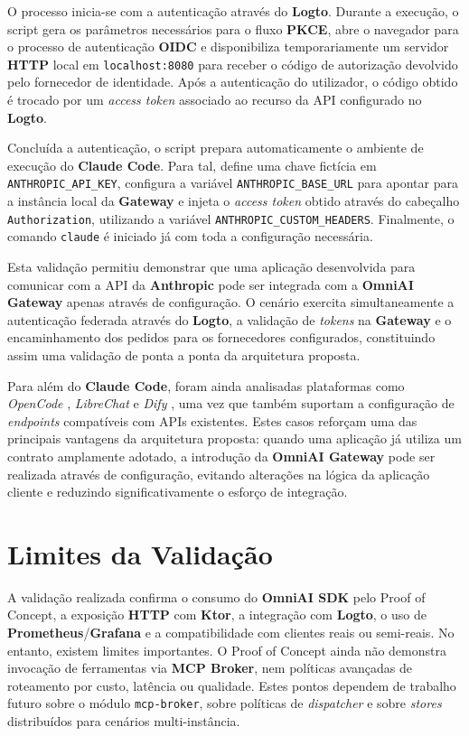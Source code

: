    O processo inicia-se com a autenticação através do \textbf{Logto}. Durante a execução, o script gera os parâmetros necessários para o fluxo \textbf{PKCE}, abre o navegador para o processo de autenticação \textbf{OIDC} e disponibiliza temporariamente um servidor \textbf{HTTP} local em \texttt{localhost:8080} para receber o código de autorização devolvido pelo fornecedor de identidade. Após a autenticação do utilizador, o código obtido é trocado por um \textit{access token} associado ao recurso da API configurado no \textbf{Logto}.

    Concluída a autenticação, o script prepara automaticamente o ambiente de execução do \textbf{Claude Code}. Para tal, define uma chave fictícia em \texttt{ANTHROPIC\_API\_KEY}, configura a variável \texttt{ANTHROPIC\_BASE\_URL} para apontar para a instância local da \textbf{Gateway} e injeta o \textit{access token} obtido através do cabeçalho \texttt{Authorization}, utilizando a variável \texttt{ANTHROPIC\_CUSTOM\_HEADERS}. Finalmente, o comando \texttt{claude} é iniciado já com toda a configuração necessária.

    Esta validação permitiu demonstrar que uma aplicação desenvolvida para comunicar com a API da \textbf{Anthropic} pode ser integrada com a \textbf{OmniAI Gateway} apenas através de configuração. O cenário exercita simultaneamente a autenticação federada através do \textbf{Logto}, a validação de \textit{tokens} na \textbf{Gateway} e o encaminhamento dos pedidos para os fornecedores configurados, constituindo assim uma validação de ponta a ponta da arquitetura proposta.

    Para além do \textbf{Claude Code}, foram ainda analisadas plataformas como \textit{OpenCode} \cite{opencode_ref}, \textit{LibreChat} \cite{librechat_ref} e \textit{Dify} \cite{dify_ref}, uma vez que também suportam a configuração de \textit{endpoints} compatíveis com APIs existentes. Estes casos reforçam uma das principais vantagens da arquitetura proposta: quando uma aplicação já utiliza um contrato amplamente adotado, a introdução da \textbf{OmniAI Gateway} pode ser realizada através de configuração, evitando alterações na lógica da aplicação cliente e reduzindo significativamente o esforço de integração.

    \section{Limites da Validação}
    A validação realizada confirma o consumo do \textbf{OmniAI SDK} pelo Proof of Concept, a exposição \textbf{HTTP} com \textbf{Ktor}, a integração com \textbf{Logto}, o uso de \textbf{Prometheus}/\textbf{Grafana} e a compatibilidade com clientes reais ou semi-reais. No entanto, existem limites importantes. O Proof of Concept ainda não demonstra invocação de ferramentas via \textbf{MCP Broker}, nem políticas avançadas de roteamento por custo, latência ou qualidade. Estes pontos dependem de trabalho futuro sobre o módulo \texttt{mcp-broker}, sobre políticas de \textit{dispatcher} e sobre \textit{stores} distribuídos para cenários multi-instância.

